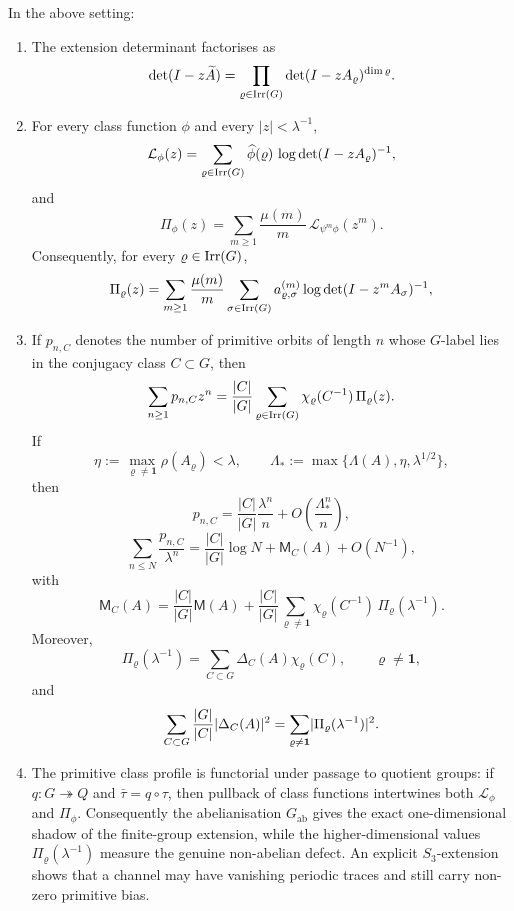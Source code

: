 \begin{theorem}\label{thm:intro-peter-weyl}
In the above setting:
\begin{enumerate}[label=\textup{(\roman*)}]
  \item The extension determinant factorises as
  \[
    \det(I-z\widetilde A)
    =\prod_{\varrho\in\operatorname{Irr}(G)}\det(I-zA_\varrho)^{\dim\varrho}.
  \]

  \item For every class function \(\phi\) and every \(|z|<\lambda^{-1}\),
  \[
    \mathcal L_\phi(z)
    =\sum_{\varrho\in\operatorname{Irr}(G)}
      \widehat\phi(\varrho)\,
      \log\det(I-zA_\varrho)^{-1},
  \]
  and
  \[
    \Pi_\phi(z)
    =\sum_{m\ge 1}\frac{\mu(m)}{m}\,
      \mathcal L_{\psi^m\phi}(z^m).
  \]
  Consequently, for every \(\varrho\in\operatorname{Irr}(G)\),
  \[
    \Pi_\varrho(z)
    =\sum_{m\ge 1}\frac{\mu(m)}{m}
      \sum_{\sigma\in\operatorname{Irr}(G)}
        a_{\varrho,\sigma}^{(m)}
        \log\det(I-z^mA_\sigma)^{-1},
  \]

  \item If \(p_{n,C}\) denotes the number of primitive orbits of length
  \(n\) whose \(G\)-label lies in the conjugacy class \(C\subset G\),
  then
  \[
    \sum_{n\ge 1}p_{n,C}z^n
    =\frac{|C|}{|G|}\sum_{\varrho\in\operatorname{Irr}(G)}
      \chi_\varrho(C^{-1})\,\Pi_\varrho(z).
  \]
  If
  \[
    \eta:=\max_{\varrho\neq\mathbf 1}\rho(A_\varrho)<\lambda,
    \qquad
    \Lambda_*:=\max\{\Lambda(A),\eta,\lambda^{1/2}\},
  \]
  then
  \[
    p_{n,C}
    =\frac{|C|}{|G|}\frac{\lambda^n}{n}
     +O\!\left(\frac{\Lambda_*^n}{n}\right),
  \]
  \[
    \sum_{n\le N}\frac{p_{n,C}}{\lambda^n}
    =\frac{|C|}{|G|}\log N+\mathsf M_C(A)+O(N^{-1}),
  \]
  with
  \[
    \mathsf M_C(A)
    =\frac{|C|}{|G|}\mathsf M(A)
     +\frac{|C|}{|G|}\sum_{\varrho\neq \mathbf 1}
      \chi_\varrho(C^{-1})\,\Pi_\varrho(\lambda^{-1}).
  \]
  Moreover,
  \[
    \Pi_\varrho(\lambda^{-1})
    =\sum_{C\subset G}\Delta_C(A)\chi_\varrho(C),
    \qquad \varrho\neq \mathbf 1,
  \]
  and
  \[
    \sum_{C\subset G}\frac{|G|}{|C|}\lvert \Delta_C(A) \rvert^2
    =\sum_{\varrho\neq \mathbf 1}
      \lvert \Pi_\varrho(\lambda^{-1}) \rvert^2.
  \]

  \item The primitive class profile is functorial under passage to
  quotient groups: if \(q:G\twoheadrightarrow Q\) and
  \(\bar\tau=q\circ\tau\), then pullback of class functions intertwines
  both \(\mathcal L_\phi\) and \(\Pi_\phi\). Consequently the
  abelianisation \(G_{\mathrm{ab}}\) gives the exact one-dimensional
  shadow of the finite-group extension, while the higher-dimensional
  values \(\Pi_\varrho(\lambda^{-1})\) measure the genuine non-abelian
  defect. An explicit \(S_3\)-extension shows that a channel may have
  vanishing periodic traces and still carry non-zero primitive bias.
\end{enumerate}
\end{theorem}

